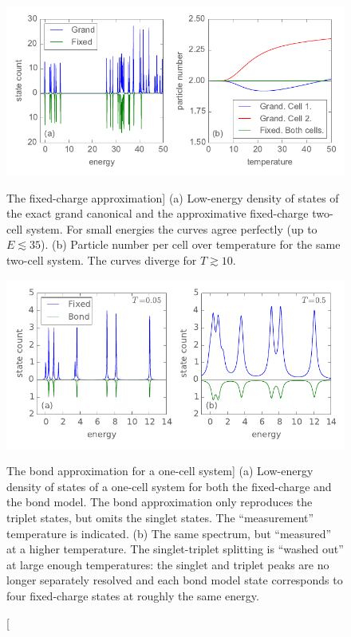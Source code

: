 \begin{figure}
  \center
  \includegraphics{fixed_charge_approximation}
  \caption
  [The fixed-charge approximation]
  {
  \label{fig:fixed_charge_approximation}
  (a) Low-energy density of states of the exact grand canonical and the
  approximative fixed-charge two-cell  system. For small energies the
  curves agree perfectly (up to $E \lesssim 35$).  (b) Particle number per cell
  over temperature for the same two-cell system.  The curves diverge for $T
  \gtrsim 10$.
  }
 
  \vspace*{0.75cm}

  \includegraphics{bond_approximation1}
  \caption
  [The bond approximation for a one-cell system]
  {
  \label{fig:bond_approximation1}
  (a) Low-energy density of states of a one-cell  system for both the
  fixed-charge and the bond model. The bond approximation only reproduces the
  triplet states, but omits the singlet states. The ``measurement'' temperature
  is indicated. (b) The same spectrum, but ``measured'' at a higher temperature.
  The singlet-triplet splitting is ``washed out'' at large enough temperatures:
  the singlet and triplet peaks are no longer separately resolved and each bond
  model state corresponds to four fixed-charge states at roughly the same
  energy.
  }
\end{figure}

